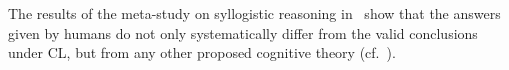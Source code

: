 \documentclass[12pt]{article}
\begin{document}
% 
The results of the meta-study on syllogistic reasoning in~\cite{khemlani:2012} show that the answers given by humans do not only systematically differ from the valid conclusions under CL, but from any other proposed cognitive theory (cf.~\cite{BJ89,johnsonlaird:1983,Rips1994,Polk1995,chater:oaksford:1999}).
\end{document}
